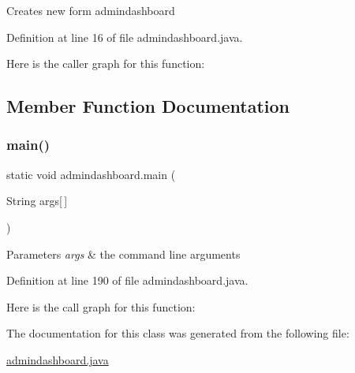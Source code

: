 Creates new form admindashboard 

Definition at line 16 of file admindashboard.\+java.

Here is the caller graph for this function\+:


\subsection{Member Function Documentation}
\mbox{\label{classadmindashboard_ae694a8be2f02c25b20c6985cbbe3ef01}} 
\subsubsection{\texorpdfstring{main()}{main()}}
{\footnotesize\ttfamily static void admindashboard.\+main (\begin{DoxyParamCaption}\item[{String}]{args\mbox{[}$\,$\mbox{]} }\end{DoxyParamCaption})\hspace{0.3cm}{\ttfamily [static]}}


\begin{DoxyParams}{Parameters}
{\em args} & the command line arguments \\
\hline
\end{DoxyParams}


Definition at line 190 of file admindashboard.\+java.

Here is the call graph for this function\+:


The documentation for this class was generated from the following file\+:\begin{DoxyCompactItemize}
\item 
\mbox{\hyperlink{admindashboard_8java}{admindashboard.\+java}}\end{DoxyCompactItemize}
